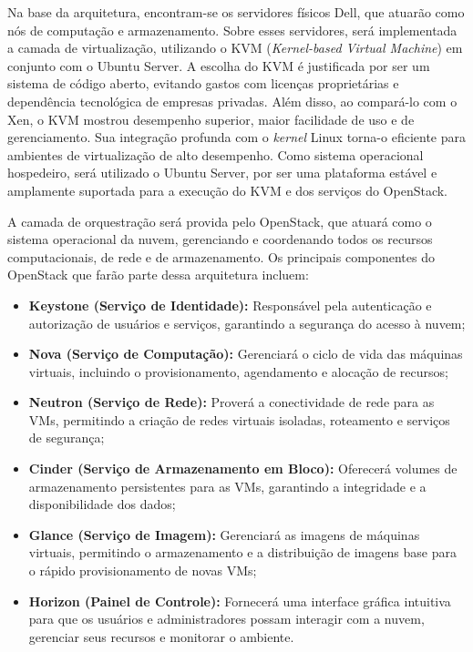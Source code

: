 Na base da arquitetura, encontram-se os servidores físicos Dell, que atuarão como nós de computação e armazenamento. Sobre esses servidores, será implementada a camada de virtualização, utilizando o KVM (\textit{Kernel-based Virtual Machine}) em conjunto com o Ubuntu Server. A escolha do KVM é justificada por ser um sistema de código aberto, evitando gastos com licenças proprietárias e dependência tecnológica de empresas privadas. Além disso, ao compará-lo com o Xen, o KVM mostrou desempenho superior, maior facilidade de uso e de gerenciamento. Sua integração profunda com o \textit{kernel} Linux torna-o eficiente para ambientes de virtualização de alto desempenho. Como sistema operacional hospedeiro, será utilizado o Ubuntu Server, por ser uma plataforma estável e amplamente suportada para a execução do KVM e dos serviços do OpenStack.

A camada de orquestração será provida pelo OpenStack, que atuará como o sistema operacional da nuvem, gerenciando e coordenando todos os recursos computacionais, de rede e de armazenamento. Os principais componentes do OpenStack que farão parte dessa arquitetura incluem:

\begin{itemize}
 \item \textbf{Keystone (Serviço de Identidade):} Responsável pela autenticação e autorização de usuários e serviços, garantindo a segurança do acesso à nuvem;
 \item \textbf{Nova (Serviço de Computação):} Gerenciará o ciclo de vida das máquinas virtuais, incluindo o provisionamento, agendamento e alocação de recursos;
 \item \textbf{Neutron (Serviço de Rede):} Proverá a conectividade de rede para as VMs, permitindo a criação de redes virtuais isoladas, roteamento e serviços de segurança;
 \item \textbf{Cinder (Serviço de Armazenamento em Bloco):} Oferecerá volumes de armazenamento persistentes para as VMs, garantindo a integridade e a disponibilidade dos dados;
 \item \textbf{Glance (Serviço de Imagem):} Gerenciará as imagens de máquinas virtuais, permitindo o armazenamento e a distribuição de imagens base para o rápido provisionamento de novas VMs;
 \item \textbf{Horizon (Painel de Controle):} Fornecerá uma interface gráfica intuitiva para que os usuários e administradores possam interagir com a nuvem, gerenciar seus recursos e monitorar o ambiente.
\end{itemize}

